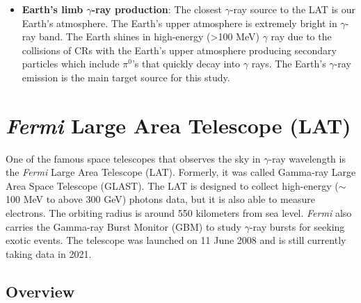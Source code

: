 \begin{itemize}
    \item \textbf{Earth's limb $\gamma$-ray production}:
    The closest $\gamma$-ray source to the LAT is our Earth's atmosphere.
    The Earth's upper atmosphere is extremely bright 
    in $\gamma$-ray band. The Earth shines in high-energy
    (>100 MeV) $\gamma$ ray due to the collisions of CRs with
    the Earth's upper atmosphere producing secondary particles
    which include $\pi^0$'s that quickly decay into $\gamma$ rays.
    The Earth's $\gamma$-ray emission is the main target source
    for this study.

\end{itemize}



\section{\textit{Fermi} Large Area Telescope (LAT)}
One of the famous space telescopes that
observes the sky in $\gamma$-ray wavelength is the
\textit{Fermi} Large Area Telescope (LAT).
Formerly, it was called Gamma-ray Large Area Space Telescope (GLAST).
The LAT is designed to collect high-energy ($\sim$100 MeV to above 300 GeV)
photons data, but it is also able to measure electrons.
The orbiting radius is around 550 kilometers
from sea level.
\textit{Fermi} also carries
the Gamma-ray Burst Monitor (GBM) to study $\gamma$-ray
bursts for seeking exotic events. The telescope was launched
on 11 June 2008 and is still currently taking data in 2021.


\subsection{Overview}

